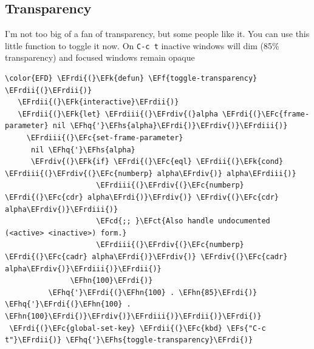 \documentclass{scrartcl}
\newcommand{\EFk}[1]{\textcolor{EFk}{#1}} %
\newcommand{\EFs}[1]{\textcolor{EFs}{#1}} %
\newcommand{\EFct}[1]{\textcolor{EFct}{#1}} %
\newcommand{\EFc}[1]{\textcolor{EFc}{#1}} %
\newcommand{\EFf}[1]{\textcolor{EFf}{#1}} %
\newcommand{\EFcd}[1]{\textcolor{EFcd}{#1}} %
\newcommand{\EFhn}[1]{#1} %
\newcommand{\EFhq}[1]{#1} %
\newcommand{\EFhs}[1]{#1} %
\newcommand{\EFrdi}[1]{#1} %
\newcommand{\EFrdii}[1]{#1} %
\newcommand{\EFrdiii}[1]{#1} %
\newcommand{\EFrdiv}[1]{#1} %
\begin{document}
\subsection{Transparency}
\label{sec:orgcb83c7c}
I'm not too big of a fan of transparency, but some people like it. You can use
this little function to toggle it now. On \texttt{C-c t} inactive windows will dim (85\%
transparency)  and focused windows remain opaque
\begin{Code}
\begin{Verbatim}[]
\color{EFD} \EFrdi{(}\EFk{defun} \EFf{toggle-transparency} \EFrdii{(}\EFrdii{)}
   \EFrdii{(}\EFk{interactive}\EFrdii{)}
   \EFrdii{(}\EFk{let} \EFrdiii{(}\EFrdiv{(}alpha \EFrdi{(}\EFc{frame-parameter} nil \EFhq{'}\EFhs{alpha}\EFrdi{)}\EFrdiv{)}\EFrdiii{)}
     \EFrdiii{(}\EFc{set-frame-parameter}
      nil \EFhq{'}\EFhs{alpha}
      \EFrdiv{(}\EFk{if} \EFrdi{(}\EFc{eql} \EFrdii{(}\EFk{cond} \EFrdiii{(}\EFrdiv{(}\EFc{numberp} alpha\EFrdiv{)} alpha\EFrdiii{)}
                     \EFrdiii{(}\EFrdiv{(}\EFc{numberp} \EFrdi{(}\EFc{cdr} alpha\EFrdi{)}\EFrdiv{)} \EFrdiv{(}\EFc{cdr} alpha\EFrdiv{)}\EFrdiii{)}
                     \EFcd{;; }\EFct{Also handle undocumented (<active> <inactive>) form.}
                     \EFrdiii{(}\EFrdiv{(}\EFc{numberp} \EFrdi{(}\EFc{cadr} alpha\EFrdi{)}\EFrdiv{)} \EFrdiv{(}\EFc{cadr} alpha\EFrdiv{)}\EFrdiii{)}\EFrdii{)}
               \EFhn{100}\EFrdi{)}
          \EFhq{'}\EFrdi{(}\EFhn{100} . \EFhn{85}\EFrdi{)} \EFhq{'}\EFrdi{(}\EFhn{100} . \EFhn{100}\EFrdi{)}\EFrdiv{)}\EFrdiii{)}\EFrdii{)}\EFrdi{)}
 \EFrdi{(}\EFc{global-set-key} \EFrdii{(}\EFc{kbd} \EFs{"C-c t"}\EFrdii{)} \EFhq{'}\EFhs{toggle-transparency}\EFrdi{)}
\end{Verbatim}
\end{Code}
\end{document}
